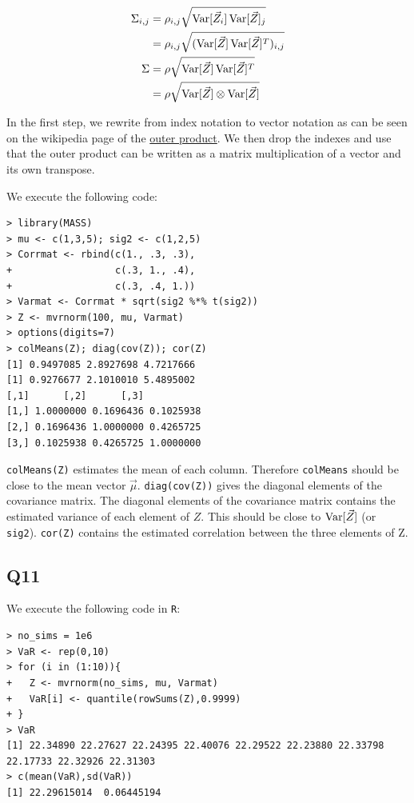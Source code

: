 \begin{align*}
\Sigma_{i,j} & = \rho_{i,j} \sqrt{\operatorname{\text{Var}}[\vec{Z}_i]\operatorname{\text{Var}}[\vec{Z}]_j} \\
             & = \rho_{i,j} \sqrt{(\operatorname{\text{Var}}[\vec{Z}]\operatorname{\text{Var}}[\vec{Z}]^{T})_{i,j}} \\
\Sigma       & = \rho \sqrt{\operatorname{\text{Var}}[\vec{Z}]\operatorname{\text{Var}}[\vec{Z}]^{T}} \\
             & = \rho \sqrt{\operatorname{\text{Var}}[\vec{Z}] \otimes \operatorname{\text{Var}}[\vec{Z}]}
\end{align*}

In the first step, we rewrite from index notation to vector notation as can be seen on the wikipedia page of the \href{https://en.wikipedia.org/wiki/Outer_product}{outer product}. We then drop the indexes and use that the outer product can be written as a matrix multiplication of a vector and its own transpose.

We execute the following code:

\begin{verbatim}
> library(MASS)
> mu <- c(1,3,5); sig2 <- c(1,2,5)
> Corrmat <- rbind(c(1., .3, .3),
+                  c(.3, 1., .4),
+                  c(.3, .4, 1.))
> Varmat <- Corrmat * sqrt(sig2 %*% t(sig2))
> Z <- mvrnorm(100, mu, Varmat)
> options(digits=7)
> colMeans(Z); diag(cov(Z)); cor(Z)
[1] 0.9497085 2.8927698 4.7217666
[1] 0.9276677 2.1010010 5.4895002
[,1]      [,2]      [,3]
[1,] 1.0000000 0.1696436 0.1025938
[2,] 0.1696436 1.0000000 0.4265725
[3,] 0.1025938 0.4265725 1.0000000
\end{verbatim}

\verb|colMeans(Z)| estimates the mean of each column. Therefore \verb|colMeans| should be close to the mean vector $\vec{\mu}$.
\verb|diag(cov(Z))| gives the diagonal elements of the covariance matrix. The diagonal elements of the covariance matrix contains the estimated variance of each element of $Z$. This should be close to $\operatorname{\text{Var}}[\vec{Z}]$ (or \verb|sig2|).
\verb|cor(Z)| contains the estimated correlation between the three elements of Z.

\subsection*{Q11}

We execute the following code in \verb|R|:

\begin{verbatim}
> no_sims = 1e6
> VaR <- rep(0,10)
> for (i in (1:10)){
+   Z <- mvrnorm(no_sims, mu, Varmat)
+   VaR[i] <- quantile(rowSums(Z),0.9999)
+ }
> VaR
[1] 22.34890 22.27627 22.24395 22.40076 22.29522 22.23880 22.33798 22.17733 22.32926 22.31303
> c(mean(VaR),sd(VaR))
[1] 22.29615014  0.06445194
\end{verbatim}

